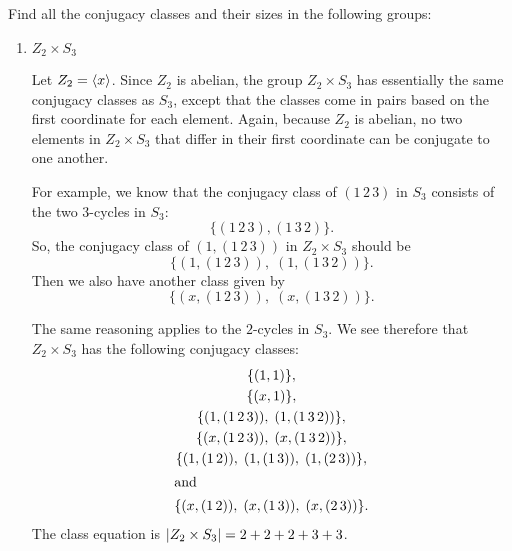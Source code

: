  Find all the conjugacy classes and their sizes in the
following groups:
\begin{enumerate}
\item \label{itm:group-actions:Z2-cross-S3-conjugacy}
  $Z_2\times S_3$
  \begin{solution}
    Let $Z_2 = \langle{x}\rangle$. Since $Z_2$ is abelian, the group
    $Z_2\times S_3$ has essentially the same conjugacy classes as
    $S_3$, except that the classes come in pairs based on the first
    coordinate for each element. Again, because $Z_2$ is abelian, no
    two elements in $Z_2\times S_3$ that differ in their first
    coordinate can be conjugate to one another.

    For example, we know that the conjugacy class of $(1\,2\,3)$ in
    $S_3$ consists of the two $3$-cycles in $S_3$:
    \begin{equation*}
      \{(1\,2\,3), (1\,3\,2)\}.
    \end{equation*}
    So, the conjugacy class of $(1, (1\,2\,3))$ in $Z_2\times S_3$
    should be
    \begin{equation*}
      \{(1, (1\,2\,3)),\; (1, (1\,3\,2))\}.
    \end{equation*}
    Then we also have another class given by
    \begin{equation*}
      \{(x, (1\,2\,3)),\; (x, (1\,3\,2))\}.
    \end{equation*}

    The same reasoning applies to the $2$-cycles in $S_3$. We see
    therefore that $Z_2\times S_3$ has the following conjugacy
    classes:
    \begin{gather*}
      \{(1, 1)\}, \\
      \{(x, 1)\}, \\
      \{(1, (1\,2\,3)),\; (1, (1\,3\,2))\}, \\
      \{(x, (1\,2\,3)),\; (x, (1\,3\,2))\}, \\
      \{(1, (1\,2)),\; (1, (1\,3)),\; (1, (2\,3))\}, \\\intertext{and}
      \{(x, (1\,2)),\; (x, (1\,3)),\; (x, (2\,3))\}.
    \end{gather*}
    The class equation is $\lvert{Z_2\times S_3}\rvert = 2 + 2 + 2 + 3 + 3$.
  \end{solution}


\end{enumerate}
